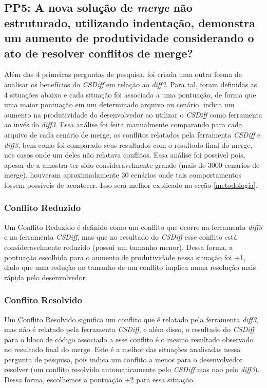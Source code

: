 \subsection{PP5: A nova solução de \emph{merge} não estruturado, utilizando indentação,
	demonstra um aumento de produtividade considerando o ato de resolver conflitos de merge?}
Além das 4 primeiras perguntas de pesquisa, foi criada uma outra forma de analisar os benefícios do \emph{CSDiff} em relação ao
\emph{diff3}.
Para tal, foram definidas as 4 situações abaixo e cada situação foi associada a uma pontuação, de forma que
uma maior pontuação em um determinado arquivo ou cenário, indica um aumento na produtividade do desenvolvedor ao
utilizar o \emph{CSDiff} como ferramenta ao invés do \emph{diff3}. Essa análise foi feita manualmente comparando para cada
arquivo
de cada cenário de merge, os conflitos relatados pela
ferramenta \emph{CSDiff} e \emph{diff3}, bem como foi comparado seus resultados
com o resultado final do merge, nos casos onde um deles não relatava conflitos. Essa análise foi possível pois, apesar de
a amostra ter sido consideravelmente grande (mais de 3000 cenários de merge), houveram aproximadamente 30 cenários onde
tais comportamentos fossem possíveis de acontecer. Isso será melhor explicado na seção \ref{metodologia}.
\subsubsection{Conflito Reduzido}
Um Conflito Reduzido é definido como um conflito que ocorre na ferramenta \emph{diff3} e na ferramenta \emph{CSDiff},
mas que no resultado do \emph{CSDiff} esse conflito está consideravelmente reduzido (possui um tamanho menor). Dessa forma,
a pontuação escolhida para o aumento de produtividade nessa situação foi +1, dado que uma redução no tamanho de um conflito
implica numa resolução mais rápida pelo desenvolvedor.
\subsubsection{Conflito Resolvido}
Um Conflito Resolvido significa um conflito que é relatado pela ferramenta \emph{diff3},
mas não é relatado pela ferramenta \emph{CSDiff}, e
além disso, o resultado do \emph{CSDiff} para o bloco de código associado a esse conflito é o mesmo resultado
observado no resultado
final do merge. Este é a melhor das situações analisadas nessa pergunta de pesquisa, pois indica um conflito a menos para o
desenvolvedor resolver (um conflito resolvido automaticamente pelo \emph{CSDiff} mas nao pelo \emph{diff3}). Dessa forma,
escolhemos a pontuação +2 para essa situação.
